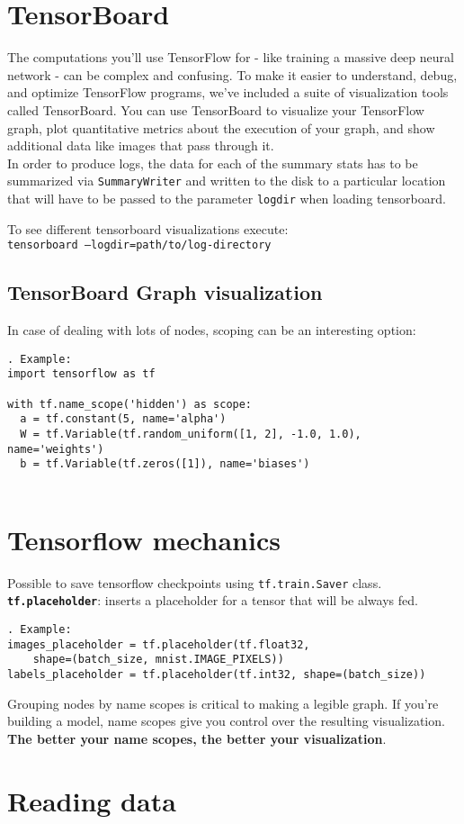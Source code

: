 \documentclass[11pt,a4paper]{article}
\begin{document}
\section{TensorBoard}
The computations you'll use TensorFlow for - like training a massive deep neural network - can be complex and confusing. To make it easier to understand, debug, and optimize TensorFlow programs, we've included a suite of visualization tools called TensorBoard. You can use TensorBoard to visualize your TensorFlow graph, plot quantitative metrics about the execution of your graph, and show additional data like images that pass through it. \\
In order to produce logs, the data for each of the summary stats has to be summarized via \texttt{SummaryWriter} and written to the disk to a particular location that will have to be passed to the parameter \texttt{logdir} when loading tensorboard. 

To see different tensorboard  visualizations execute: \\ 
\texttt{tensorboard --logdir=path/to/log-directory}

\subsection{TensorBoard Graph visualization}
In case of dealing with lots of nodes, scoping can be an interesting option: 
\begin{lstlisting}. Example: 
import tensorflow as tf

with tf.name_scope('hidden') as scope:
  a = tf.constant(5, name='alpha')
  W = tf.Variable(tf.random_uniform([1, 2], -1.0, 1.0), name='weights')
  b = tf.Variable(tf.zeros([1]), name='biases')
  
  \end{lstlisting} 
\section{Tensorflow mechanics}
Possible to save tensorflow checkpoints using \texttt{tf.train.Saver} class.\\
\textbf{\texttt{tf.placeholder}}: inserts a placeholder for a tensor that will be always fed. 
\begin{lstlisting}. Example: 
images_placeholder = tf.placeholder(tf.float32, 
	shape=(batch_size, mnist.IMAGE_PIXELS))
labels_placeholder = tf.placeholder(tf.int32, shape=(batch_size))
\end{lstlisting}
Grouping nodes by name scopes is critical to making a legible graph. If you're building a model, name scopes give you control over the resulting visualization. \textbf{The better your name scopes, the better your visualization}.

\section{Reading data}
\end{document}
